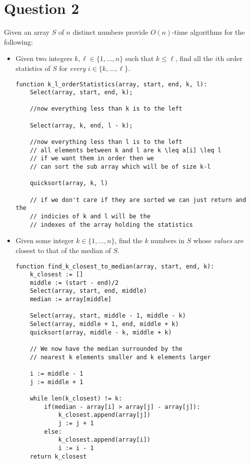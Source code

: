 \documentclass{article}
\begin{document}
\section*{Question 2}
Given an array $S$ of $n$ distinct numbers provide $O(n)$-time algorithms for the following:
\begin{itemize}

\item Given two integers $k,\ell \in \{1,\dots, n\}$ such that $k\leq \ell$, find all the $i$th order statistics of $S$ for \emph{every}
$i\in \{k, \dots, \ell\}$.

\begin{lstlisting}
function k_l_orderStatistics(array, start, end, k, l):
    Select(array, start, end, k);

    //now everything less than k is to the left

    Select(array, k, end, l - k);

    //now everything less than l is to the left
    // all elements between k and l are k \leq a[i] \leq l
    // if we want them in order then we
    // can sort the sub array which will be of size k-l

    quicksort(array, k, l)

    // if we don't care if they are sorted we can just return and the
    // indicies of k and l will be the
    // indexes of the array holding the statistics

\end{lstlisting}

\item Given some integer $k\in \{1,\dots, n\}$, find the $k$ numbers in $S$ whose \emph{values} are closest to that of the median of $S$.

\begin{lstlisting}
function find_k_closest_to_median(array, start, end, k):
    k_closest := []
    middle := (start - end)/2
    Select(array, start, end, middle)
    median := array[middle]

    Select(array, start, middle - 1, middle - k)
    Select(array, middle + 1, end, middle + k)
    quicksort(array, middle - k, middle + k)

    // We now have the median surrounded by the
    // nearest k elements smaller and k elements larger

    i := middle - 1
    j := middle + 1

    while len(k_closest) != k:
        if(median - array[i] > array[j] - array[j]):
            k_closest.append(array[j])
            j := j + 1
        else:
            k_closest.append(array[i])
            i := i - 1
    return k_closest
\end{lstlisting}
\end{itemize}
\end{document}
